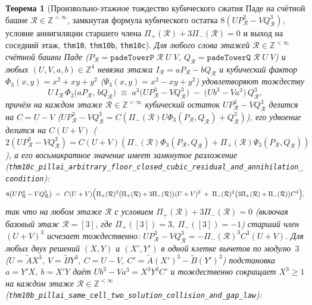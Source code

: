 \documentclass[11pt,a4paper]{article}
\theoremstyle{plain}
\newtheorem{theorem}{Теорема}[section]
\theoremstyle{definition}
\begin{document}
\begin{theorem}[Произвольно-этажное тождество кубического сжатия Паде на счётной башне $\mathcal{R}\in\mathbb{Z}^{<\infty}$, замкнутая формула кубического остатка $8(U P_{\mathcal{R}}^3 - V Q_{\mathcal{R}}^3)$, условие аннигиляции старшего члена $\Pi_+(\mathcal{R})+3\Pi_-(\mathcal{R})=0$ и выход на соседний этаж, \texttt{thm10}, \texttt{thm10b}, \texttt{thm10c}]
\label{thm:main-10}
Для любого слова этажей $\mathcal{R}\in\mathbb{Z}^{<\infty}$ счётной башни Паде ($P_{\mathcal{R}} = \texttt{padeTowerP}\;\mathcal{R}\;U\;V$, $Q_{\mathcal{R}} = \texttt{padeTowerQ}\;\mathcal{R}\;U\;V$) и любых $(U,V,a,b)\in\mathbb{Z}^4$ невязка этажа $I_{\mathcal{R}} = a P_{\mathcal{R}} - b Q_{\mathcal{R}}$ и кубический фактор $\Phi_3(x,y) = x^2 + xy + y^2$ ($\Psi_3(x,y) = x^2 - xy + y^2$) удовлетворяют тождеству
\begin{equation}
  \label{eq:root-free-cubic-compression}
  U\,I_{\mathcal{R}}\,\Phi_3\bigl(a P_{\mathcal{R}},\,b Q_{\mathcal{R}}\bigr) \;\equiv\; a^3\bigl(U P_{\mathcal{R}}^3 - V Q_{\mathcal{R}}^3\bigr) \;-\; \bigl(U b^3 - V a^3\bigr)\,Q_{\mathcal{R}}^3,
\end{equation}
причём на каждом этаже $\mathcal{R}\in\mathbb{Z}^{<\infty}$ кубический остаток $U P_{\mathcal{R}}^3 - V Q_{\mathcal{R}}^3$ делится на $C = U - V$ ($U P_{\mathcal{R}}^3 - V Q_{\mathcal{R}}^3 = C(\Pi_-(\mathcal{R})U\Phi_3(P_{\mathcal{R}},Q_{\mathcal{R}}) + Q_{\mathcal{R}}^3)$), его удвоение делится на $C(U+V)$ ($2(U P_{\mathcal{R}}^3 - V Q_{\mathcal{R}}^3) = C(U+V)(\Pi_-(\mathcal{R})\Phi_3(P_{\mathcal{R}},Q_{\mathcal{R}}) + \Pi_+(\mathcal{R})\Psi_3(P_{\mathcal{R}},Q_{\mathcal{R}}))$), а его восьмикратное значение имеет замкнутое разложение (\texttt{thm10c\_pillai\_arbitrary\_floor\_closed\_cubic\_residual\_and\_annihilation\_condition}):
\begin{equation}
  \label{eq:closed-form-cubic-residual-8x}
  8\bigl(U P_{\mathcal{R}}^3 - V Q_{\mathcal{R}}^3\bigr)
  \;=\; C(U+V)\Bigl(\Pi_+(\mathcal{R})^2\bigl(\Pi_+(\mathcal{R})+3\Pi_-(\mathcal{R})\bigr)(U+V)^2
  \;+\; \Pi_-(\mathcal{R})^2\bigl(3\Pi_+(\mathcal{R})+\Pi_-(\mathcal{R})\bigr)C^2\Bigr),
\end{equation}
так что на любом этаже $\mathcal{R}$ с условием $\Pi_+(\mathcal{R}) + 3\Pi_-(\mathcal{R}) = 0$ (включая базовый этаж $\mathcal{R}=[3]$, где $\Pi_+([3])=3,\ \Pi_-([3])=-1$) старший член $(U+V)^3$ исчезает тождественно: $U P_{\mathcal{R}}^3 - V Q_{\mathcal{R}}^3 = -\Pi_-(\mathcal{R})^3 C^3(U+V)$. Для любых двух решений $(X,Y)$ и $(X',Y')$ в одной клетке вычетов по модулю~$3$ ($U = \widetilde{A}X^3,\ V = \widetilde{B}Y^3,\ C = U-V,\ C' = \widetilde{A}(X')^3 - \widetilde{B}(Y')^3$) подстановка $a = Y'X,\ b = X'Y$ даёт $U b^3 - V a^3 = X^3 Y^3 C'$ и тождественно сокращает $X^3 \ge 1$ на каждом этаже $\mathcal{R}\in\mathbb{Z}^{<\infty}$ (\texttt{thm10b\_pillai\_same\_cell\_two\_solution\_collision\_and\_gap\_law}):

\end{theorem}
\end{document}

